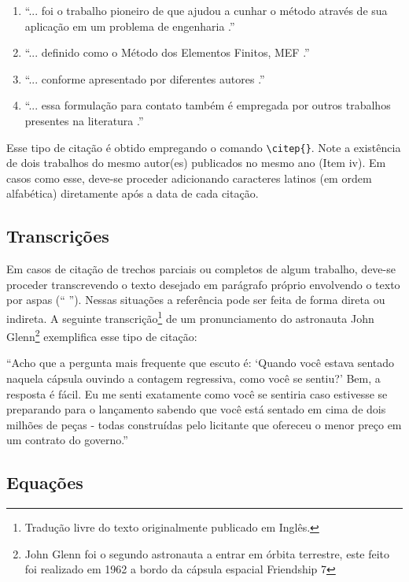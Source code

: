 \begin{enumerate}[label = {\roman*} - ,itemindent = 0.8 cm]
	\item ``... foi o trabalho pioneiro de \citealp{turner1956stiffness} que ajudou a cunhar o método através de sua aplicação em um problema de engenharia \citep{bathe1996finite}.''
	\item ``... definido como o Método dos Elementos Finitos, MEF \citep{hughes2012finite}.''
	\item ``... conforme apresentado por diferentes autores \citep{reddy2006introduction, zienkiewicz2005finite, bathe1996finite}.''
	\item ``... essa formulação para contato \citep{man1993incremental} também é empregada por outros trabalhos presentes na literatura \citep{man1993engineering}.''
\end{enumerate}

Esse tipo de citação é obtido empregando o comando \verb|\citep{}|. Note a existência de dois trabalhos do mesmo autor(es) publicados no mesmo ano (Item iv). Em casos como esse, deve-se proceder adicionando caracteres latinos (em ordem alfabética) diretamente após a data de cada citação. 

\subsection{Transcrições}

Em casos de citação de trechos parciais ou completos de algum trabalho, deve-se proceder transcrevendo o texto desejado em parágrafo próprio envolvendo o texto por aspas (`` ''). Nessas situações a referência pode ser feita de forma direta ou indireta. A seguinte transcrição\footnote{Tradução livre do texto originalmente publicado em Inglês.} de um pronunciamento do astronauta John Glenn\footnote{John Glenn foi o segundo astronauta a entrar em órbita terrestre, este feito foi realizado em 1962 a bordo da cápsula espacial Friendship 7} exemplifica esse tipo de citação:


``Acho que a pergunta mais frequente que escuto é: `Quando você estava sentado naquela cápsula ouvindo a contagem regressiva, como você se sentiu?' Bem, a resposta é fácil. Eu me senti exatamente como você se sentiria caso estivesse se preparando para o lançamento sabendo que você está sentado em cima de dois milhões de peças - todas construídas pelo licitante que ofereceu o menor preço em um contrato do governo.'' \citep{kranz2009failure}

\subsection{Equações}


